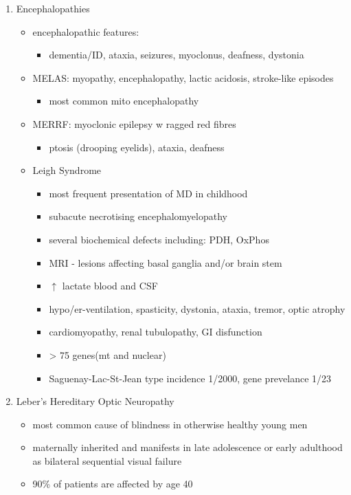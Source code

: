 \documentclass{scrartcl}
\begin{document}
\begin{enumerate}
\begin{enumerate}
\item Encephalopathies
\label{sec:org906e83f}
\begin{itemize}
\item encephalopathic features:
\begin{itemize}
\item dementia/ID, ataxia, seizures, myoclonus, deafness, dystonia
\end{itemize}
\item MELAS: myopathy, encephalopathy, lactic acidosis, stroke-like episodes
\begin{itemize}
\item most common mito encephalopathy
\end{itemize}
\item MERRF: myoclonic epilepsy w ragged red fibres
\begin{itemize}
\item ptosis (drooping eyelids), ataxia, deafness
\end{itemize}
\item Leigh Syndrome
\begin{itemize}
\item most frequent presentation of MD in childhood
\item subacute necrotising encephalomyelopathy
\item several biochemical defects including: PDH, OxPhos
\item MRI - lesions affecting basal ganglia and/or brain stem
\item \(\uparrow\) lactate blood and CSF
\item hypo/er-ventilation, spasticity, dystonia, ataxia, tremor, optic atrophy
\item cardiomyopathy, renal tubulopathy, GI disfunction
\item \textgreater{} 75 genes(mt and nuclear)
\item Saguenay-Lac-St-Jean type incidence 1/2000, gene prevelance 1/23
\end{itemize}
\end{itemize}
\item Leber’s Hereditary Optic Neuropathy
\label{sec:org86ecad4}
\begin{itemize}
\item most common cause of blindness in otherwise healthy young men
\item maternally inherited and manifests in late adolescence or early
adulthood as bilateral sequential visual failure
\item 90\% of patients are affected by age 40
\end{itemize}


\end{enumerate}
\end{enumerate}
\end{document}
